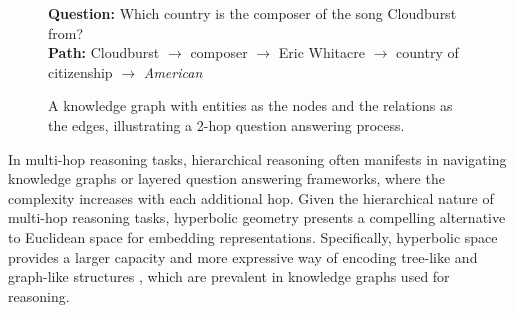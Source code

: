 \documentclass[11pt]{article}
\begin{document}
\begin{figure}[t]
\begin{center}
\end{center}

\small
\noindent \textbf{Question:} Which \textcolor{citizenshipColor}{country} is the \textcolor{composerColor}{composer} of the song \textcolor{cloudburstColor}{Cloudburst} from?\\[1em]
\noindent \textbf{Path:} \textcolor{cloudburstColor}{Cloudburst} $\rightarrow$ \textcolor{composerColor}{composer} $\rightarrow$ Eric Whitacre $\rightarrow$ \textcolor{citizenshipColor}{country of citizenship} $\rightarrow$ \textit{American}
\caption{A knowledge graph with entities as the nodes and the relations as the edges, illustrating a 2-hop question answering process.}
\label{fig:sample_knowledge_graph}
\end{figure}


In multi-hop reasoning tasks, hierarchical reasoning often manifests in navigating knowledge graphs or layered question answering frameworks, where the complexity increases with each additional hop. Given the hierarchical nature of multi-hop reasoning tasks, hyperbolic geometry presents a compelling alternative to Euclidean space for embedding representations. Specifically, hyperbolic space provides a larger capacity and more expressive way of encoding tree-like and graph-like structures \cite{chami2019hyperbolicgcnn}, which are prevalent in knowledge graphs used for reasoning.
\end{document}
